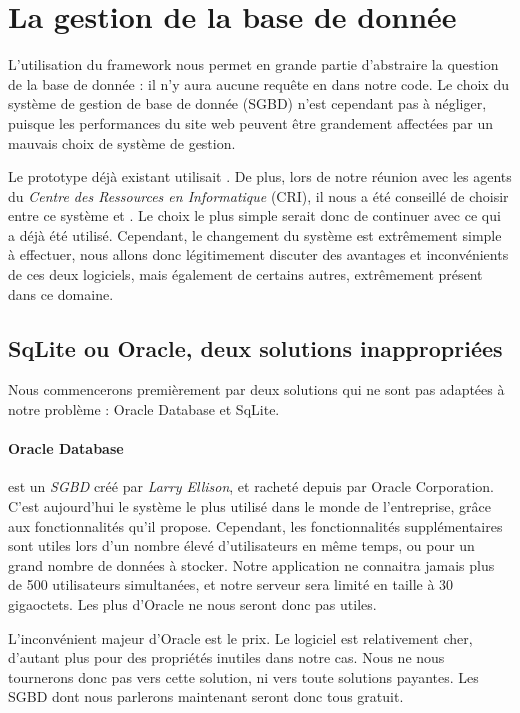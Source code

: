 \section{La gestion de la base de donnée}

L'utilisation du framework \symfony nous permet en grande partie d'abstraire la question de la base de donnée : il n'y aura aucune requête en \sql dans notre code. 
Le choix du système de gestion de base de donnée (SGBD) n'est cependant pas  à négliger, puisque les performances du site web peuvent être grandement affectées par un mauvais choix de système de gestion. 

Le prototype déjà existant utilisait \mysql. 
De plus, lors de notre réunion avec les agents du \textit{Centre des Ressources en Informatique} (CRI), il nous a été conseillé de choisir entre ce système et \psql. 
Le choix le plus simple serait donc de continuer avec ce qui a déjà été utilisé. 
Cependant, le changement du système est extrêmement simple à effectuer, nous allons donc légitimement  discuter des avantages et inconvénients de ces deux logiciels, mais également de certains autres, extrêmement présent dans ce domaine. 

\subsection{SqLite ou Oracle, deux solutions inappropriées}

Nous commencerons premièrement par deux solutions qui ne sont pas adaptées à notre problème : Oracle Database et SqLite. 

\paragraph*{Oracle Database } est un \textit{SGBD} créé par \textit{Larry Ellison}, et racheté depuis par Oracle Corporation. C'est aujourd'hui le système le plus utilisé dans le monde de l'entreprise, grâce aux fonctionnalités qu'il propose. 
Cependant, les fonctionnalités supplémentaires sont utiles lors d'un nombre élevé d'utilisateurs en même temps, ou pour un grand nombre de données à stocker. Notre application ne connaitra jamais plus de 500 utilisateurs simultanées, et notre serveur sera limité en taille à 30 gigaoctets. Les plus d'Oracle ne nous seront donc pas utiles. 

L'inconvénient majeur d'Oracle est le prix. Le logiciel est relativement cher, d'autant plus pour des propriétés inutiles dans notre cas.
Nous ne nous tournerons donc pas vers cette solution, ni vers toute solutions payantes. Les SGBD dont nous parlerons maintenant seront donc tous gratuit. 


